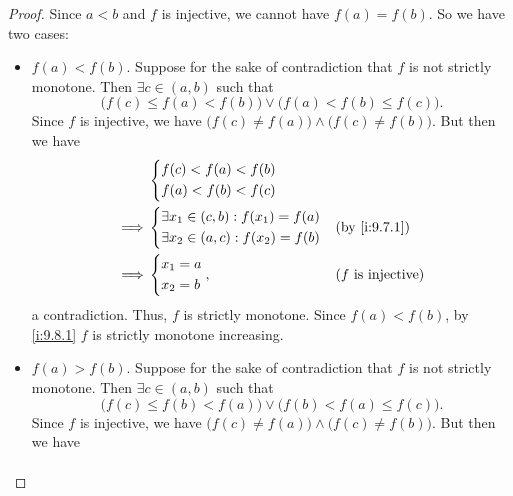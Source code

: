 \begin{proof}
  Since \(a < b\) and \(f\) is injective, we cannot have \(f(a) = f(b)\).
  So we have two cases:
  \begin{itemize}
    \item \(f(a) < f(b)\).
          Suppose for the sake of contradiction that \(f\) is not strictly monotone.
          Then \(\exists c \in (a, b)\) such that
          \[
            \big(f(c) \leq f(a) < f(b)\big) \lor \big(f(a) < f(b) \leq f(c)\big).
          \]
          Since \(f\) is injective, we have \(\big(f(c) \neq f(a)\big) \land \big(f(c) \neq f(b)\big)\).
          But then we have
          \begin{align*}
                     & \begin{dcases}
                         f(c) < f(a) < f(b) \\
                         f(a) < f(b) < f(c)
                       \end{dcases}                                                        \\
            \implies & \begin{dcases}
                         \exists x_1 \in (c, b) : f(x_1) = f(a) \\
                         \exists x_2 \in (a, c) : f(x_2) = f(b) \\
                       \end{dcases} &  & \by{i:9.7.1}                                    \\
            \implies & \begin{dcases}
                         x_1 = a \\
                         x_2 = b
                       \end{dcases},                            &  & \text{(\(f\) is injective)}
          \end{align*}
          a contradiction.
          Thus, \(f\) is strictly monotone.
          Since \(f(a) < f(b)\), by \cref{i:9.8.1} \(f\) is strictly monotone increasing.
    \item \(f(a) > f(b)\).
          Suppose for the sake of contradiction that \(f\) is not strictly monotone.
          Then \(\exists c \in (a, b)\) such that
          \[
            \big(f(c) \leq f(b) < f(a)\big) \lor \big(f(b) < f(a) \leq f(c)\big).
          \]
          Since \(f\) is injective, we have \(\big(f(c) \neq f(a)\big) \land \big(f(c) \neq f(b)\big)\).
          But then we have
          \begin{align*}

\end{align*}
\end{itemize}
\end{proof}
